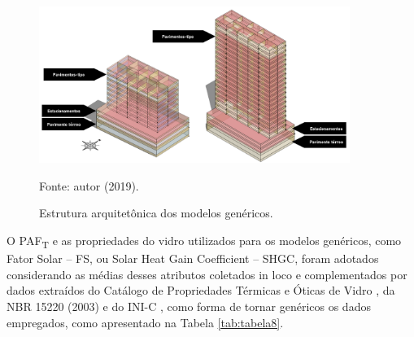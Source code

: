 \begin{figure}[H]
    \centering
    \caption{Estrutura arquitetônica dos modelos genéricos.}
    \includegraphics[width=0.9\textwidth]{figures/fig11_8-19-2pav.png}
    \begin{flushleft}
        \par \small Fonte: autor (2019).
    \end{flushleft}
    \label{fig:figura9}
\end{figure}
\noindent O PAF\textsubscript{T} e as propriedades do vidro utilizados para os modelos genéricos, como Fator Solar – FS, ou Solar Heat Gain Coefficient – SHGC, foram adotados considerando as médias desses atributos coletados in loco e complementados por dados extraídos do Catálogo de Propriedades Térmicas e Óticas de Vidro \cite{CentroBrasileirodeEficienciaEnergeticaemEdificacoesCB3E2015,AssociacaoBrasileiradeNormasTecnicas-ABNT2003}, da NBR 15220 (2003) e do INI-C \cite{InstitutoNacionaldeMetrologiaNormalizacaoeQualidadeIndustrial-INMETRO2018}, como forma de tornar genéricos os dados empregados, como apresentado na Tabela \ref{tab:tabela8}.%
